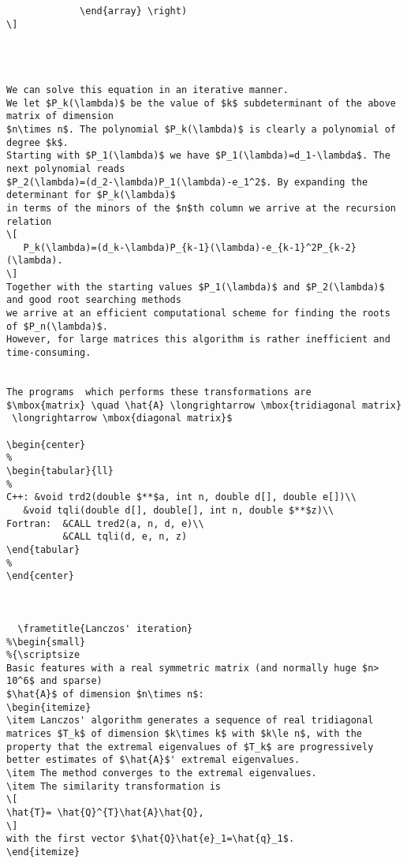 {\begin{lstlisting}
             \end{array} \right)
\] 




We can solve this equation in an iterative manner. 
We let $P_k(\lambda)$ be the value of $k$ subdeterminant of the above matrix of dimension
$n\times n$. The polynomial $P_k(\lambda)$ is clearly a polynomial of degree $k$.
Starting with $P_1(\lambda)$ we have $P_1(\lambda)=d_1-\lambda$. The next polynomial reads
$P_2(\lambda)=(d_2-\lambda)P_1(\lambda)-e_1^2$. By expanding the determinant for $P_k(\lambda)$ 
in terms of the minors of the $n$th column we arrive at the recursion relation
\[ 
   P_k(\lambda)=(d_k-\lambda)P_{k-1}(\lambda)-e_{k-1}^2P_{k-2}(\lambda).
\]
Together with the starting values $P_1(\lambda)$ and $P_2(\lambda)$ and good root searching methods
we arrive at an efficient computational scheme for finding the roots of $P_n(\lambda)$. 
However, for large matrices this algorithm is rather inefficient and time-consuming.


The programs  which performs these transformations are
$\mbox{matrix} \quad \hat{A} \longrightarrow \mbox{tridiagonal matrix}
 \longrightarrow \mbox{diagonal matrix}$

\begin{center} 
%
\begin{tabular}{ll}
%
C++: &void trd2(double $**$a, int n, double d[], double e[])\\
   &void tqli(double d[], double[], int n, double $**$z)\\
Fortran:  &CALL tred2(a, n, d, e)\\
          &CALL tqli(d, e, n, z)
\end{tabular}
%
\end{center}



  \frametitle{Lanczos' iteration}
%\begin{small}
%{\scriptsize
Basic features with a real symmetric matrix (and normally huge $n> 10^6$ and sparse) 
$\hat{A}$ of dimension $n\times n$:
\begin{itemize}
\item Lanczos' algorithm generates a sequence of real tridiagonal matrices $T_k$ of dimension $k\times k$ with $k\le n$, with the property that the extremal eigenvalues of $T_k$ are progressively better estimates of $\hat{A}$' extremal eigenvalues.
\item The method converges to the extremal eigenvalues.
\item The similarity transformation is 
\[
\hat{T}= \hat{Q}^{T}\hat{A}\hat{Q},
\]
with the first vector $\hat{Q}\hat{e}_1=\hat{q}_1$.
\end{itemize}




\end{lstlisting}}

